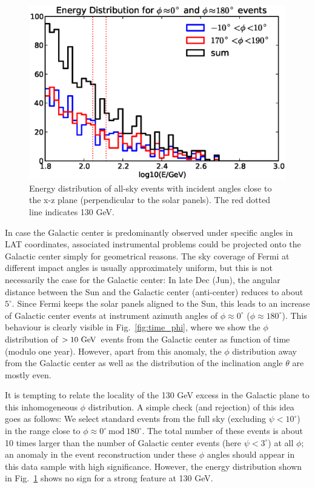 \documentclass[aps,twocolumn,prd,superscriptaddress,showpacs,nofootinbib,fixfloat]{revtex4}
\newcommand{\GeV}{{\rm ~GeV}}
\begin{document}
\begin{figure}
\centering
\includegraphics[width=1.0\linewidth]{plots/phi_energy.eps}
\caption{Energy distribution of all-sky events with incident angles close to
the x-z plane (perpendicular to the solar panels). The red dotted line
indicates 130 GeV.}
\label{fig:spectrum_phi}
\end{figure}

In case the Galactic center is predominantly observed under specific angles in
LAT coordinates, associated instrumental problems could be projected onto the
Galactic center simply for geometrical reasons. The sky coverage of Fermi at
different impact angles is usually approximately uniform, but this is not
necessarily the case for the Galactic center: In late Dec (Jun), the angular
distance between the Sun and the Galactic center (anti-center) reduces to
about $5^\circ$.  Since Fermi keeps the solar panels aligned to the Sun, this
leads to an increase of Galactic center events at instrument azimuth angles of
$\phi\approx 0^\circ$ ($\phi\approx 180^\circ$). This behaviour is clearly
visible in Fig.~\ref{fig:time_phi}, where we show the $\phi$ distribution of
$>10\GeV$ events from the Galactic center as function of time (modulo one
year).  However, apart from this anomaly, the $\phi$ distribution away from
the Galactic center as well as the distribution of the inclination angle
$\theta$ are mostly even.

It is tempting to relate the locality of the 130 GeV excess in the Galactic
plane to this inhomogeneous $\phi$ distribution. A simple check (and
rejection) of this idea goes as follows: We select standard events from the
full sky (excluding $\psi < 10^\circ$) in the range close to $\phi\approx
0^\circ\ \text{mod}\ 180^\circ$. The total number of these events is about 10
times larger than the number of Galactic center events (here $\psi<3^\circ$)
at all $\phi$; an anomaly in the event reconstruction under these $\phi$
angles should appear in this data sample with high significance. However, the
energy distribution shown in Fig.~\ref{fig:spectrum_phi} shows no sign for a
strong feature at 130 GeV.
\end{document}
